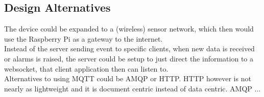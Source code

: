 \subsection*{Design Alternatives}
The device could be expanded to a (wireless) sensor network, which then would use the Raspberry Pi as a gateway to the internet.\\
Instead of the server sending event to specific clients, when new data is received or alarms is raised, the server could be setup to just direct the information to a websocket, that client application then can listen to.\\
Alternatives to using MQTT could be AMQP or HTTP. HTTP however is not nearly as lightweight and it is document centric instead of data centric. AMQP ...
